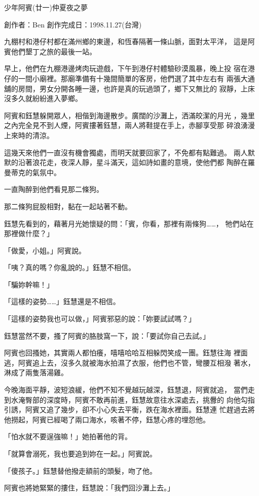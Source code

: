 



少年阿賓(廿一)仲夏夜之夢

創作者：Ben
創作完成日：1998.11.27(台灣)


九棚村和港仔村都在滿州鄉的東邊，和恆春隔著一條山脈，面對太平洋，
這是阿賓他們墾丁之旅的最後一站。

早上，他們在九棚港邊烤肉玩遊戲，下午到港仔村體驗砂漠風暴，晚上投
宿在港仔的一間小廟裡。那廟準備有十幾間簡單的客房，他們選了其中左右有
兩張大通舖的房間，男女分開各睡一邊，也許是真的玩過頭了，鄉下又無比的
寂靜，上床沒多久就紛紛進入夢鄉。

阿賓和鈺慧躲開眾人，相偕到海邊散步。廣闊的沙灘上，洒滿皎潔的月光
，幾里之內完全見不到人煙，阿賓摟著鈺慧，兩人將鞋提在手上，赤腳享受那
碎浪湧漫上來時的清涼。

這幾天來他們一直沒有機會獨處，而明天就要回家了，不免都有點難過。
兩人默默的沿著浪花走，夜深人靜，星斗滿天，這如詩如畫的意境，使他們都
陶醉在羅曼蒂克的氣氛中。

一直陶醉到他們看見那二條狗。

那二條狗屁股相對，黏在一起站著不動。

鈺慧先看到的，藉著月光她懷疑的問：「賓，你看，那裡有兩條狗……，
牠們站在那裡做什麼？」

「做愛，小姐。」阿賓說。

「咦？真的嗎？你亂說的。」鈺慧不相信。

「騙妳幹嘛！」

「這樣的姿勢……」鈺慧還是不相信。

「這樣的姿勢我也可以做，」阿賓邪惡的說：「妳要試試嗎？」

鈺慧當然不要，搔了阿賓的胳肢窩一下，說：「要試你自己去試。」

阿賓也回搔她，其實兩人都怕癢，嘻嘻哈哈互相躲閃笑成一團。鈺慧往海
裡面逃，阿賓追上去，沒多久就被海水拍濕了衣服，他們也不管，彎腰互相潑
著水，淋成了兩隻落湯雞。

今晚海面平靜，波短浪緩，他們不知不覺越玩越深，鈺慧退，阿賓就追，
當們走到水淹臀部的深度時，阿賓不敢再前進，鈺慧故意往水深處去，挑釁的
向他勾指引誘，阿賓又追了幾步，卻不小心失去平衡，跌在海水裡面。鈺慧連
忙趕過去將他撈起，阿賓已經喝了兩口海水，咳著不停，鈺慧心疼的埋怨他。

「怕水就不要逞強嘛！」她拍著他的背。

「就算會溺死，我也要追到妳在一起。」阿賓說。

「傻孩子。」鈺慧替他撥走額前的頭髮，吻了他。

阿賓也將她緊緊的摟住，鈺慧說：「我們回沙灘上去。」

